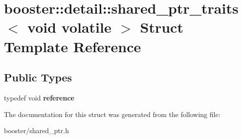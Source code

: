 \section{booster\+:\+:detail\+:\+:shared\+\_\+ptr\+\_\+traits$<$ void volatile $>$ Struct Template Reference}
\label{structbooster_1_1detail_1_1shared__ptr__traits_3_01void_01volatile_01_4}
\subsection*{Public Types}
\begin{DoxyCompactItemize}
\item 
typedef void {\bfseries reference}\label{structbooster_1_1detail_1_1shared__ptr__traits_3_01void_01volatile_01_4_a50f14dc01ccc1b66de69860c6523b417}

\end{DoxyCompactItemize}


The documentation for this struct was generated from the following file\+:\begin{DoxyCompactItemize}
\item 
booster/shared\+\_\+ptr.\+h\end{DoxyCompactItemize}
